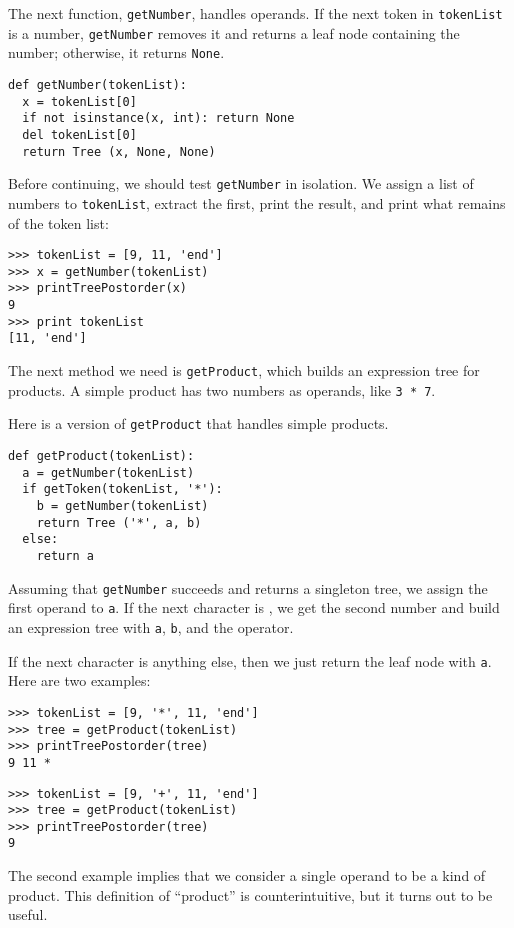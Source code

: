 The next function, {\tt getNumber}, handles operands.
If the next token in {\tt tokenList} is a number,
{\tt getNumber} removes it and returns a leaf node containing
the number; otherwise, it returns {\tt None}.

\beforeverb
\begin{verbatim}
def getNumber(tokenList):
  x = tokenList[0]
  if not isinstance(x, int): return None
  del tokenList[0]
  return Tree (x, None, None)
\end{verbatim}
\afterverb
%
Before continuing, we should test {\tt getNumber} in isolation.  We
assign a list of numbers to {\tt tokenList}, extract the first,
print the result, and print what remains of the token list:

\beforeverb
\begin{verbatim}
>>> tokenList = [9, 11, 'end']
>>> x = getNumber(tokenList)
>>> printTreePostorder(x)
9
>>> print tokenList
[11, 'end']
\end{verbatim}
\afterverb
%
The next method we need is {\tt getProduct}, which builds an
expression tree for products.  A simple product has two numbers as
operands, like {\tt 3 * 7}.

Here is a version of {\tt getProduct} that handles
simple products.

\beforeverb
\begin{verbatim}
def getProduct(tokenList):
  a = getNumber(tokenList)
  if getToken(tokenList, '*'):
    b = getNumber(tokenList)
    return Tree ('*', a, b)
  else:
    return a
\end{verbatim}
\afterverb
%
Assuming that {\tt getNumber} succeeds and returns a singleton tree,
we assign the first operand to {\tt a}.
If the next character is {\tt *}, we get the second number
and build an expression tree with {\tt a}, {\tt b},
and the operator.

If the next character is anything else, then we just return
the leaf node with {\tt a}.  Here are two examples:

\beforeverb
\begin{verbatim}
>>> tokenList = [9, '*', 11, 'end']
>>> tree = getProduct(tokenList)
>>> printTreePostorder(tree)
9 11 *
\end{verbatim}
\afterverb

\beforeverb
\begin{verbatim}
>>> tokenList = [9, '+', 11, 'end']
>>> tree = getProduct(tokenList)
>>> printTreePostorder(tree)
9
\end{verbatim}
\afterverb
%
The second example implies that we consider a single
operand to be a kind of product.  This definition of
``product'' is counterintuitive, but it turns out to
be useful.  

